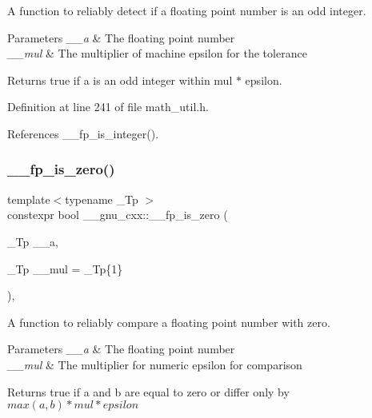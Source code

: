 A function to reliably detect if a floating point number is an odd integer.


\begin{DoxyParams}{Parameters}
{\em \+\_\+\+\_\+a} & The floating point number \\
\hline
{\em \+\_\+\+\_\+mul} & The multiplier of machine epsilon for the tolerance \\
\hline
\end{DoxyParams}
\begin{DoxyReturn}{Returns}
{\ttfamily true} if a is an odd integer within mul $\ast$ epsilon. 
\end{DoxyReturn}


Definition at line 241 of file math\+\_\+util.\+h.



References \+\_\+\+\_\+fp\+\_\+is\+\_\+integer().

\mbox{\label{namespace____gnu__cxx_aea3be1eb8940437aa8571ab8654af660}} 
\subsubsection{\texorpdfstring{\+\_\+\+\_\+fp\+\_\+is\+\_\+zero()}{\_\_fp\_is\_zero()}}
{\footnotesize\ttfamily template$<$typename \+\_\+\+Tp $>$ \\
constexpr bool \+\_\+\+\_\+gnu\+\_\+cxx\+::\+\_\+\+\_\+fp\+\_\+is\+\_\+zero (\begin{DoxyParamCaption}\item[{\+\_\+\+Tp}]{\+\_\+\+\_\+a,  }\item[{\+\_\+\+Tp}]{\+\_\+\+\_\+mul = {\ttfamily \+\_\+Tp\{1\}} }\end{DoxyParamCaption})\hspace{0.3cm}{\ttfamily [inline]}, {\ttfamily [noexcept]}}

A function to reliably compare a floating point number with zero.


\begin{DoxyParams}{Parameters}
{\em \+\_\+\+\_\+a} & The floating point number \\
\hline
{\em \+\_\+\+\_\+mul} & The multiplier for numeric epsilon for comparison \\
\hline
\end{DoxyParams}
\begin{DoxyReturn}{Returns}
{\ttfamily true} if a and b are equal to zero or differ only by $ max(a,b) * mul * epsilon $ 
\end{DoxyReturn}


